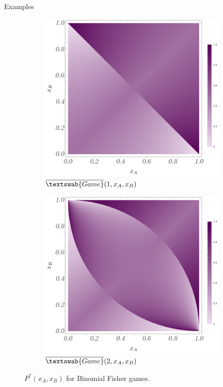 \documentclass{beamer}
\theoremstyle{definition}
\newcommand{\InfG}[1]{$\overline{\textswab{Game}}(#1)$}
\begin{document}
\begin{frame}{Examples}

    \begin{figure}[H]
    \centering
    \begin{subfigure}[b]{0.4\textwidth}
        \includegraphics[width=\textwidth]{img/BinomialFisher_1.png}
        \caption{\small \centering \InfG{1,x_A,x_B}}
        \label{fig:PG_1}
    \end{subfigure}
    \hspace{0.05\textwidth} %
    \begin{subfigure}[b]{0.4\textwidth}
        \includegraphics[width=\textwidth]{img/BinomialFisher_2.png}
        \caption{\small \centering \InfG{2,x_A,x_B}}
        \label{fig:PG_2}
    \end{subfigure}
    
    \caption{\small \centering $P^*(x_A,x_B)$ for Binomial Fisher games.}
    \label{fig:P_InfG_1_2}
\end{figure}

\end{frame}
\end{document}
